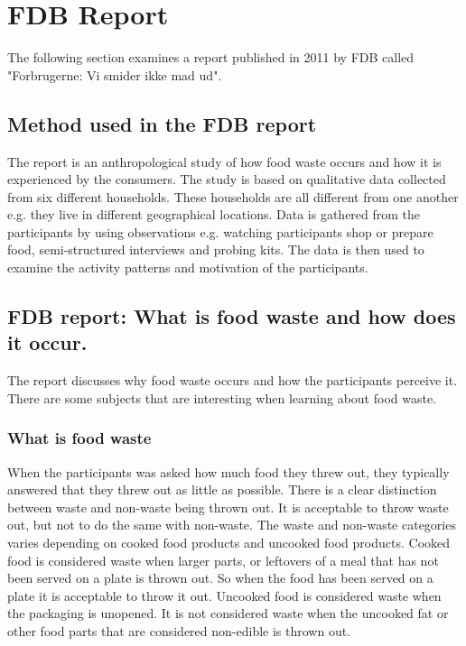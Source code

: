 \section{FDB Report}
The following section examines a report published in 2011 by FDB called "Forbrugerne: Vi smider ikke mad ud"\cite{madSpild_FDB}.
\subsection{Method used in the FDB report}
The report is an anthropological study of how food waste occurs and how it is experienced by the consumers. The study is based on qualitative data collected from six different households. These households are all different from one another e.g. they live in different geographical locations. Data is gathered from the participants by using observations e.g. watching participants shop or prepare food, semi-structured interviews and probing kits. The data is then used to examine the activity patterns and motivation of the participants.

\subsection{FDB report: What is food waste and how does it occur.}
The report discusses why food waste occurs and how the participants perceive it. There are some subjects that are interesting when learning about food waste. 

\subsubsection{What is food waste}
When the participants was asked how much food they threw out, they typically answered that they threw out as little as possible. There is a clear distinction between waste and non-waste being thrown out. It is acceptable to throw waste out, but not to do the same with non-waste. The waste and non-waste categories varies depending on cooked food products and uncooked food products. Cooked food is considered waste when larger parts, or leftovers of a meal that has not been served on a plate is thrown out. So when the food has been served on a plate it is acceptable to throw it out. Uncooked food is considered waste when the packaging is unopened. It is not considered waste when the uncooked fat or other food parts that are considered non-edible is thrown out.


